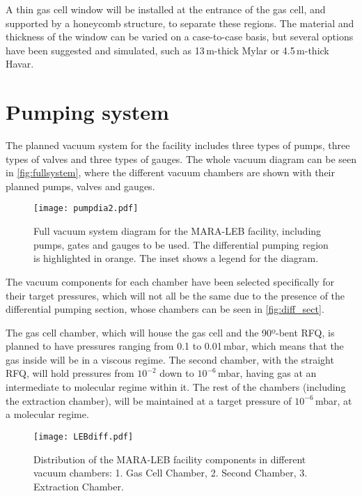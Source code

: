 A thin gas cell window will be installed at the entrance of the gas cell, and supported by a honeycomb structure, to separate these regions. The material and thickness of the window can be varied on a case-to-case basis, but several options have been suggested and simulated, such as 13\,\textmu m-thick Mylar or 4.5\,\textmu m-thick Havar.

\section{Pumping system}
\label{sec:pump}

The planned vacuum system for the facility includes three types of pumps, three types of valves and three types of gauges. The whole vacuum diagram can be seen in \autoref{fig:fullsystem}, where the different vacuum chambers are shown with their planned pumps, valves and gauges.

\begin{figure}[h]
    \centering
    \texttt{[image: pumpdia2.pdf]}
     \caption{Full vacuum system diagram for the MARA-LEB facility, including pumps, gates and gauges to be used. The differential pumping region is highlighted in orange. The inset shows a legend for the diagram.}
     \label{fig:fullsystem}
 \end{figure}

The vacuum components for each chamber have been selected specifically for their target pressures, which will not all be the same due to the presence of the differential pumping section, whose chambers can be seen in \autoref{fig:diff_sect}. 
\newpage

The gas cell chamber, which will house the gas cell and the 90º-bent RFQ, is planned to have pressures ranging from 0.1 to 0.01\,mbar, which means that the gas inside will be in a viscous regime. The second chamber, with the straight RFQ, will hold pressures from $10^{-2}$ down to $10^{-6}$\,mbar, having gas at an intermediate to molecular regime within it. The rest of the chambers (including the extraction chamber), will be maintained at a target pressure of $10^{-6}$\,mbar, at a molecular regime. 


 \begin{figure}[H]
     \centering
      \texttt{[image: LEBdiff.pdf]}
      \caption{Distribution of the MARA-LEB facility components in different vacuum chambers: 1. Gas Cell Chamber, 2. Second Chamber, 3. Extraction Chamber.}
      \label{fig:diff_sect}
  \end{figure}

